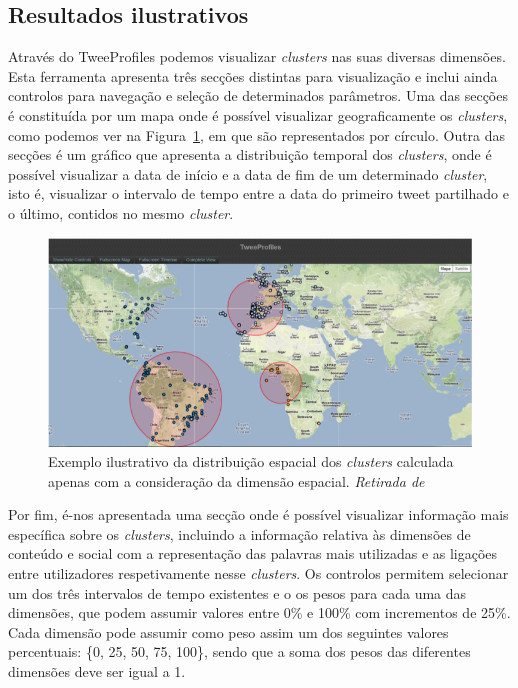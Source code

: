 \subsection{Resultados ilustrativos} \label{subsec:tpresult}

Através do TweeProfiles podemos visualizar \textit{clusters} nas suas diversas dimensões. Esta ferramenta apresenta três secções distintas para visualização e inclui ainda controlos para navegação e seleção de determinados parâmetros. Uma das secções é constituída por um mapa onde é possível visualizar geograficamente os \textit{clusters}, como podemos ver na Figura~\ref{fig:maptweep1}, em que são representados por círculo. Outra das secções é um gráfico que apresenta a distribuição temporal dos \textit{clusters}, onde é possível visualizar a data de início e a data de fim de um determinado \textit{cluster}, isto é, visualizar o intervalo de tempo entre a data do primeiro tweet partilhado e o último, contidos no mesmo \textit{cluster}.
\begin{figure}[h]
\centering
\includegraphics[width=0.9\linewidth]{./figures/tweeprofiles/maptweep1}
\caption{Exemplo ilustrativo da distribuição espacial dos \textit{clusters} calculada apenas com a consideração da dimensão espacial. \textit{Retirada de}~\cite{Cunha2013}}
\label{fig:maptweep1}
\end{figure}
Por fim, é-nos apresentada uma secção onde é possível visualizar informação mais específica sobre os \textit{clusters}, incluindo a informação relativa às dimensões de conteúdo e social com a representação das palavras mais utilizadas e as ligações entre utilizadores respetivamente nesse \textit{clusters}. Os controlos permitem selecionar um dos três intervalos de tempo existentes e o os pesos para cada uma das dimensões, que podem assumir valores entre 0\% e 100\% com incrementos de 25\%. Cada dimensão pode assumir como peso assim um dos seguintes valores percentuais: \{0, 25, 50, 75, 100\}, sendo que a soma dos pesos das diferentes dimensões deve ser igual a 1. 

